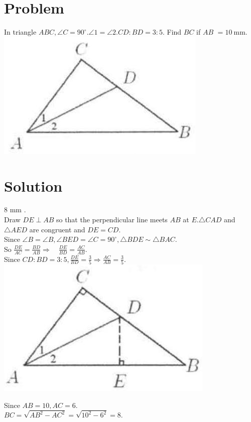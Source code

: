 \documentclass{article}
\begin{document}
\section*{Problem}
In triangle \(A B C, \angle C=90^{\circ} . \angle 1=\angle 2 . C D: B D=3: 5\). Find \(B C\) if \(A B\) \(=10 \mathrm{~mm}\).\\
\centering
\includegraphics[width=\textwidth]{images/064(1).jpg}

\section*{Solution}
8 mm .\\
Draw \(D E \perp A B\) so that the perpendicular line meets \(A B\) at \(E . \triangle C A D\) and \(\triangle A E D\) are congruent and \(D E=C D\).\\
Since \(\angle B=\angle B, \angle B E D=\angle C=90^{\circ}, \triangle B D E \sim \triangle B A C\).\\
So \(\frac{D E}{A C}=\frac{B D}{A B} \Rightarrow \quad \frac{D E}{B D}=\frac{A C}{A B}\).\\
Since \(C D: B D=3: 5, \frac{D E}{B D}=\frac{3}{5} \Rightarrow \frac{A C}{A B}=\frac{3}{5}\).\\
\centering
\includegraphics[width=\textwidth]{images/067.jpg}

Since \(A B=10, A C=6\).\\
\(B C=\sqrt{A B^{2}-A C^{2}}=\sqrt{10^{2}-6^{2}}=8\).
\end{document}
